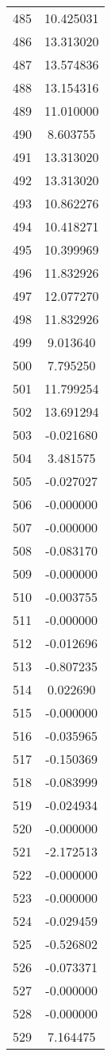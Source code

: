 \documentclass[12pt]{article}
\begin{document}
\begin{longtable}{@{}cc@{}}
485 & 10.425031 \\
486 & 13.313020 \\
487 & 13.574836 \\
488 & 13.154316 \\
489 & 11.010000 \\
490 & 8.603755 \\
491 & 13.313020 \\
492 & 13.313020 \\
493 & 10.862276 \\
494 & 10.418271 \\
495 & 10.399969 \\
496 & 11.832926 \\
497 & 12.077270 \\
498 & 11.832926 \\
499 & 9.013640 \\
500 & 7.795250 \\
501 & 11.799254 \\
502 & 13.691294 \\
503 & -0.021680 \\
504 & 3.481575 \\
505 & -0.027027 \\
506 & -0.000000 \\
507 & -0.000000 \\
508 & -0.083170 \\
509 & -0.000000 \\
510 & -0.003755 \\
511 & -0.000000 \\
512 & -0.012696 \\
513 & -0.807235 \\
514 & 0.022690 \\
515 & -0.000000 \\
516 & -0.035965 \\
517 & -0.150369 \\
518 & -0.083999 \\
519 & -0.024934 \\
520 & -0.000000 \\
521 & -2.172513 \\
522 & -0.000000 \\
523 & -0.000000 \\
524 & -0.029459 \\
525 & -0.526802 \\
526 & -0.073371 \\
527 & -0.000000 \\
528 & -0.000000 \\
529 & 7.164475 \\

\end{longtable}
\end{document}
